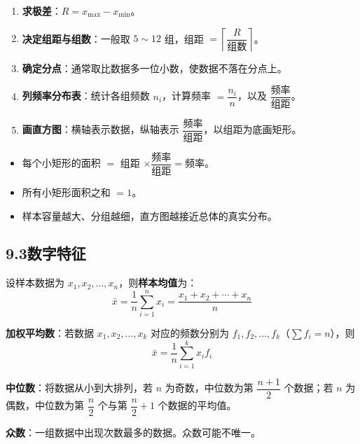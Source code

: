 \documentclass[12pt, a4paper]{ctexart}
\begin{document}
\begin{knowledgebox}[绘制频率分布直方图的步骤]
\begin{enumerate}[label=(\arabic*)]
  \item \textbf{求极差}：$R = x_{\max} - x_{\min}$。
  \item \textbf{决定组距与组数}：一般取 $5 \sim 12$ 组，组距 $= \left\lceil \dfrac{R}{\text{组数}} \right\rceil$。
  \item \textbf{确定分点}：通常取比数据多一位小数，使数据不落在分点上。
  \item \textbf{列频率分布表}：统计各组频数 $n_i$，计算频率 $= \dfrac{n_i}{n}$，以及 $\dfrac{\text{频率}}{\text{组距}}$。
  \item \textbf{画直方图}：横轴表示数据，纵轴表示 $\dfrac{\text{频率}}{\text{组距}}$，以组距为底画矩形。
\end{enumerate}
\end{knowledgebox}

\begin{tipbox}[频率分布直方图的关键性质]
\begin{itemize}
  \item 每个小矩形的面积 $=$ 组距 $\times \dfrac{\text{频率}}{\text{组距}} = \text{频率}$。
  \item 所有小矩形面积之和 $= 1$。
  \item 样本容量越大、分组越细，直方图越接近总体的真实分布。
\end{itemize}
\end{tipbox}

\subsection*{9.3\quad 数字特征}

\begin{knowledgebox}[平均数（均值）]
设样本数据为 $x_1, x_2, \ldots, x_n$，则\textbf{样本均值}为：
\[
\bar{x} = \frac{1}{n}\sum_{i=1}^{n} x_i = \frac{x_1 + x_2 + \cdots + x_n}{n}
\]

\textbf{加权平均数}：若数据 $x_1, x_2, \ldots, x_k$ 对应的频数分别为 $f_1, f_2, \ldots, f_k$（$\sum f_i = n$），则
\[
\bar{x} = \frac{1}{n}\sum_{i=1}^{k} x_i f_i
\]
\end{knowledgebox}

\begin{knowledgebox}[中位数与众数]
\textbf{中位数}：将数据从小到大排列，若 $n$ 为奇数，中位数为第 $\dfrac{n+1}{2}$ 个数据；若 $n$ 为偶数，中位数为第 $\dfrac{n}{2}$ 个与第 $\dfrac{n}{2}+1$ 个数据的平均值。

\textbf{众数}：一组数据中出现次数最多的数据。众数可能不唯一。
\end{knowledgebox}
\end{document}
